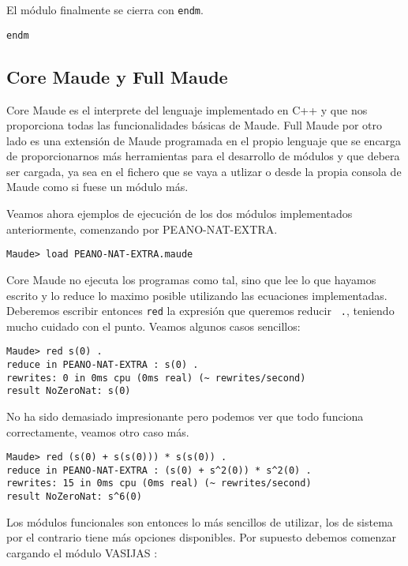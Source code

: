 El módulo finalmente se cierra con \texttt{endm}.
{\codesize
\begin{verbatim}
endm
\end{verbatim}
}

\subsection{Core Maude y Full Maude}

Core Maude es el interprete del lenguaje implementado en C++ y que nos proporciona todas las funcionalidades básicas de Maude. Full Maude por otro lado es una extensión de Maude programada en el propio lenguaje que se encarga de proporcionarnos más herramientas para el desarrollo de módulos y que debera ser cargada, ya sea en el fichero que se vaya a utlizar o desde la propia consola de Maude como si fuese un módulo más.\par

Veamos ahora ejemplos de ejecución de los dos módulos implementados anteriormente, comenzando por PEANO-NAT-EXTRA.\par

{\codesize
\begin{verbatim}
Maude> load PEANO-NAT-EXTRA.maude
\end{verbatim}
}

Core Maude no ejecuta los programas como tal, sino que lee lo que hayamos escrito y lo reduce lo maximo posible utilizando las ecuaciones implementadas. Deberemos escribir entonces \texttt{red} la expresión que queremos reducir \verb" .", teniendo mucho cuidado con el punto. Veamos algunos casos sencillos:
{\codesize
\begin{verbatim}
Maude> red s(0) .
reduce in PEANO-NAT-EXTRA : s(0) .
rewrites: 0 in 0ms cpu (0ms real) (~ rewrites/second)
result NoZeroNat: s(0)
\end{verbatim}
}

No ha sido demasiado impresionante pero podemos ver que todo funciona correctamente, veamos otro caso más.\par

{\codesize
\begin{verbatim}
Maude> red (s(0) + s(s(0))) * s(s(0)) .
reduce in PEANO-NAT-EXTRA : (s(0) + s^2(0)) * s^2(0) .
rewrites: 15 in 0ms cpu (0ms real) (~ rewrites/second)
result NoZeroNat: s^6(0)
\end{verbatim}
}

Los módulos funcionales son entonces lo más sencillos de utilizar, los de sistema por el contrario tiene más opciones disponibles. Por supuesto debemos comenzar cargando el módulo VASIJAS :\par


